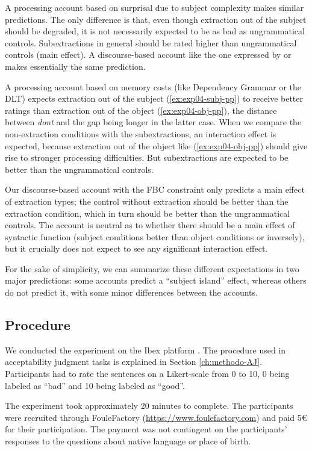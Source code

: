 A processing account based on surprisal due to subject complexity \citep[such as][]{Kluender.2004} makes similar predictions. The only difference is that, even though extraction out of the subject should be degraded, it is not necessarily expected to be as bad as  ungrammatical controls. Subextractions in general should be rated higher than ungrammatical controls (main effect). A discourse-based account like the one expressed by \citet{Erteschik-Shir.1973} or \citet{Goldberg.2006} makes essentially the same prediction.

A processing account based on memory costs (like Dependency Grammar or the DLT) expects extraction out of the subject  (\ref{ex:exp04-subj-pp}) to receive better ratings than extraction out of the object (\ref{ex:exp04-obj-pp}), the distance between \emph{dont} and the gap being longer in the latter case. When we compare the non-extraction conditions with the subextractions, an interaction effect is expected, because extraction out of the object like (\ref{ex:exp04-obj-pp}) should give rise to stronger processing difficulties. But subextractions are expected to be better than the ungrammatical controls. 

Our discourse-based account with the FBC constraint only predicts a main effect of extraction types; the control without extraction should be better than the extraction condition, which in turn should be better than the ungrammatical controls. The account is neutral as to whether there should be a main effect of syntactic function (subject conditions better than object conditions or inversely), but it crucially does not expect to see any significant interaction effect. 

For the sake of simplicity, we can summarize these different expectations in two major predictions: some accounts predict a ``subject island'' effect, whereas others do not predict it, with some minor differences between the accounts.  

\subsection{Procedure}

We conducted the experiment on the Ibex platform \citep{Ibex}. The procedure used in acceptability judgment tasks is explained in Section \ref{ch:methodo-AJ}. Participants had to rate the sentences on a Likert-scale from 0 to 10, 0 being labeled as ``bad'' and 10 being labeled as ``good''.

The experiment took approximately 20 minutes to complete. The participants were recruited through FouleFactory (\url{https://www.foulefactory.com}) and paid 5€ for their participation. The payment was not contingent on the participants' responses to the questions about native language or place of birth.

